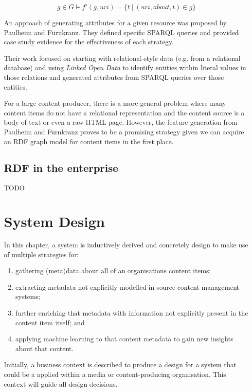 \documentclass[10pt,a4paper]{report}
\begin{document}
$$
g \in G \models f'(g, uri) = \{t \: | \: (uri, about, t) \in g\} 
$$

An approach of generating attributes for a given resource was proposed by
Paulheim and F\"urnkranz\cite{paulheim2012unsupervised}. They defined specific
SPARQL queries and provided case study evidence for the effectiveness of
each strategy.

Their work focused on starting with relational-style data (e.g. from a
relational database) and using \emph{Linked Open Data} to identify entities
within literal values in those relations and generated attributes from
SPARQL queries over those entities.

For a large content-producer, there is a more general problem where many content
items do not have a relational representation and the content source is a body
of text or even a raw HTML page. However, the feature generation from Paulheim
and F\:urnkranz proves to be a promising strategy given we can acquire an RDF
graph model for content items in the first place.

\section{RDF in the enterprise}
\label{sec:linked-enterprise-data}

TODO

\chapter{System Design}

In this chapter, a system is inductively derived and concretely design to make
use of multiple strategies for:

\begin{enumerate}
\item gathering (meta)data about all of an organisations content items;
\item extracting metadata not explicitly modelled in source content management
systems;
\item further enriching that metadata with information not explicitly present
in the content item itself; and
\item applying machine learning to that content metadata to gain new insights
about that content.
\end{enumerate}

Initially, a business context is described to produce a design for a system
that could be a applied within a media or content-producing organisation. This
context will guide all design decisions.
\end{document}
